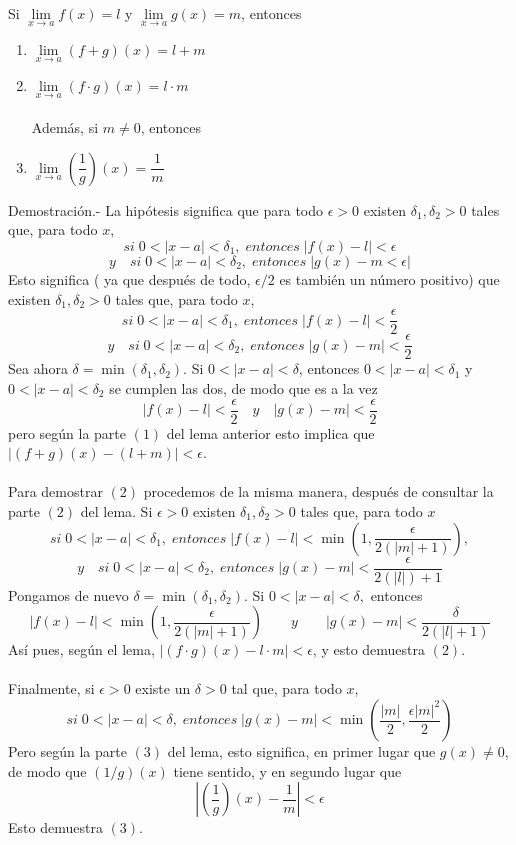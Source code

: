 \begin{teo}
    Si $\lim\limits_{x \to a} f(x) = l$ y $\lim\limits_{x \to a} g(x) = m$, entonces 
    \begin{enumerate}[\bfseries (1)]
	\item  $\lim\limits_{x \to a} (f+g)(x) = l+m$
	\item  $\lim\limits_{x \to a} (f\cdot g)(x) = l\cdot m$\\\\
	Además, si $m\neq 0$, entonces
	\item  $\lim\limits_{x \to a} (\dfrac{1}{g})(x) = \dfrac{1}{m}$
    \end{enumerate}
	Demostración.-\; La hipótesis significa que para todo $\epsilon > 0$ existen $\delta_1, \delta_2>0$ tales que, para todo $x$, $$si \; 0<|x-a|<\delta_1, \; entonces \; |f(x)-l|<\epsilon$$ 
	$$y \quad si \; 0<|x-a|<\delta_2, \; entonces \; |g(x)-m < \epsilon|$$
	Esto significa ( ya que después de todo, $\epsilon/2$ es también un número positivo) que existen $\delta_1,\delta_2>0$ tales que, para todo $x$,
	$$si \; 0<|x-a|<\delta_1, \; entonces \; |f(x)-l|<\dfrac{\epsilon}{2}$$
	$$y \quad si \; 0<|x-a|<\delta_2, \; entonces \; |g(x)-m|<\dfrac{\epsilon}{2}$$
	Sea ahora $\delta = \min(\delta_1,\delta_2)$. Si $0<|x-a|<\delta$, entonces $0<|x-a|<\delta_1$ y $0<|x-a|<\delta_2$ se cumplen las dos, de modo que es a la vez $$|f(x)-l|<\dfrac{\epsilon}{2} \quad y \quad |g(x)-m|<\dfrac{\epsilon}{2}$$
	pero según la parte $(1)$ del lema anterior esto implica que $|(f+g)(x) - (l+m)|< \epsilon$.\\\\
	Para demostrar $(2)$ procedemos de la misma manera, después de consultar la parte $(2)$ del lema. Si $\epsilon>0$ existen $\delta_1,\delta_2>0$ tales que, para todo $x$ $$si\; 0<|x-a|<\delta_1, \; entonces \; |f(x)-l|<\min\left(1,\dfrac{\epsilon}{2(|m|+1)}\right),$$ $$y\quad si\; 0<|x-a|<\delta_2,\; entonces \; |g(x)-m|<\dfrac{\epsilon}{2(|l|)+1}$$ Pongamos de nuevo $\delta = \min(\delta_1,\delta_2)$. Si $0<|x-a|<\delta,$ entonces $$|f(x)-l|<\min\left(1,\dfrac{\epsilon}{2(|m|+1)}\right) \qquad y \qquad |g(x)-m|<\dfrac{\delta}{2(|l|+1)}$$
	Así pues, según el lema, $|(f\cdot g)(x)-l\cdot m|<\epsilon$, y esto demuestra $(2)$.\\\\
	Finalmente, si $\epsilon>0$ existe un $\delta>0$ tal que, para todo $x$, $$si\; 0<|x-a|<\delta, \; entonces \; |g(x)-m|< \min\left(\dfrac{|m|}{2},\dfrac{\epsilon|m|^2}{2}\right)$$
	Pero según la parte $(3)$ del lema, esto significa, en primer lugar que $g(x)\neq 0$, de modo que $(1/g)(x)$ tiene sentido, y en segundo lugar que $$\left|\left(\dfrac{1}{g}\right)(x)-\dfrac{1}{m}\right|<\epsilon$$
	Esto demuestra $(3)$.\\\\
\end{teo}

